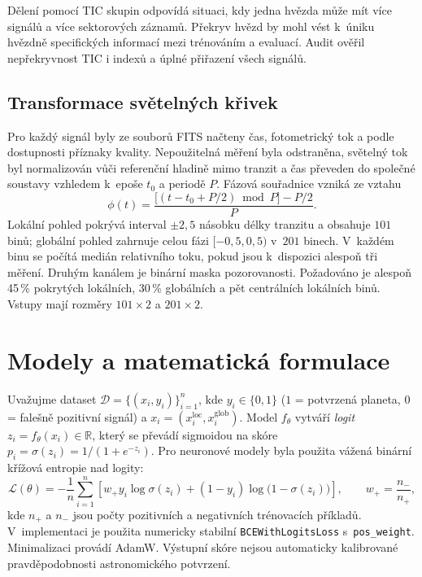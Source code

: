 \documentclass[11pt,a4paper]{article}
\newcommand{\code}[1]{\texttt{#1}}
\begin{document}
Dělení pomocí TIC skupin odpovídá situaci, kdy jedna hvězda může mít více signálů a více sektorových záznamů. Překryv hvězd by mohl vést k~úniku hvězdně specifických informací mezi trénováním a evaluací. Audit ověřil nepřekryvnost TIC i indexů a úplné přiřazení všech signálů.

\subsection{Transformace světelných křivek}
Pro každý signál byly ze souborů FITS načteny čas, fotometrický tok a podle dostupnosti příznaky kvality. Nepoužitelná měření byla odstraněna, světelný tok byl normalizován vůči referenční hladině mimo tranzit a čas převeden do společné soustavy vzhledem k~epoše $t_0$ a periodě $P$. Fázová souřadnice vzniká ze vztahu
\begin{equation}
 \phi(t)=\frac{\big[(t-t_0+P/2)\bmod P\big]-P/2}{P}.
 \label{eq:phase}
\end{equation}
Lokální pohled pokrývá interval $\pm2{,}5$ násobku délky tranzitu a obsahuje $101$ binů; globální pohled zahrnuje celou fázi $[-0{,}5,0{,}5)$ v~$201$ binech. V~každém binu se počítá medián relativního toku, pokud jsou k~dispozici alespoň tři měření. Druhým kanálem je binární maska pozorovanosti. Požadováno je alespoň 45\,\% pokrytých lokálních, 30\,\% globálních a pět centrálních lokálních binů. Vstupy mají rozměry $101\times2$ a $201\times2$.

\section{Modely a matematická formulace}
Uvažujme dataset $\mathcal D=\{(x_i,y_i)\}_{i=1}^{n}$, kde $y_i\in\{0,1\}$ ($1$ = potvrzená planeta, $0$ = falešně pozitivní signál) a $x_i=(x_i^{\mathrm{loc}},x_i^{\mathrm{glob}})$. Model $f_{\theta}$ vytváří \emph{logit} $z_i=f_{\theta}(x_i)\in\mathbb R$, který se převádí sigmoidou na skóre $p_i=\sigma(z_i)=1/(1+e^{-z_i})$. Pro neuronové modely byla použita vážená binární křížová entropie nad logity:
\begin{equation}
\mathcal L(\theta)=-\frac1n\sum_{i=1}^n\!\left[w_+ y_i\log\sigma(z_i)+(1-y_i)\log\bigl(1-\sigma(z_i)\bigr)\right],
\qquad w_+=\frac{n_-}{n_+},
\label{eq:loss}
\end{equation}
kde $n_+$ a $n_-$ jsou počty pozitivních a negativních trénovacích příkladů. V~implementaci je použita numericky stabilní \code{BCEWithLogitsLoss} s~\code{pos\_weight}. Minimalizaci provádí AdamW. Výstupní skóre nejsou automaticky kalibrované pravděpodobnosti astronomického potvrzení.
\end{document}
